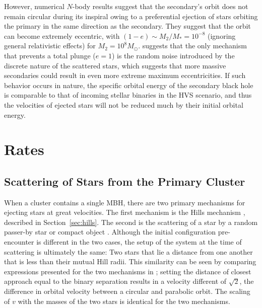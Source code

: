 \documentclass[a4paper,twocolumn]{emulateapj}
\begin{document}
{However, numerical $N$-body results \citep{Baumgardt:2006b,Iwasawa:2011a,Khan:2012a} suggest that the secondary's orbit does not remain circular during its inspiral owing to a preferential ejection of stars orbiting the primary in the same direction as the secondary. They suggest that the orbit can become extremely eccentric, with $(1 - e) \sim M_{2}/M_{\ast} = 10^{-8}$ (ignoring general relativistic effects) for $M_{2} = 10^{8} M_{\odot}$. \citet{Iwasawa:2011a} suggests that the only mechanism that prevents a total plunge ($e = 1$) is the random noise introduced by the discrete nature of the scattered stars, which suggests that more massive secondaries could result in even more extreme maximum eccentricities. If such behavior occurs in nature, the specific orbital energy of the secondary black hole is comparable to that of incoming stellar binaries in the HVS scenario, and thus the velocities of ejected stars will not be reduced much by their initial orbital energy.

\section{Rates}

\subsection{Scattering of Stars from the Primary Cluster}

When a cluster contains a single MBH, there are two primary mechanisms for ejecting stars at great velocities. The first mechanism is the Hills mechanism \citep{Hills:1988a}, described in Section~\ref{sec:hills}. The second is the scattering of a star by a random passer-by star or compact object \citep{Binney:1998a,OLeary:2008a}. Although the initial configuration pre-encounter is different in the two cases, the setup of the system at the time of scattering is ultimately the same: Two stars that lie a distance from one another that is less than their mutual Hill radii. This similarity can be seen by comparing expressions presented for the two mechanisms in \citet{Yu:2003a}; setting the distance of closest approach equal to the binary separation results in a velocity different of $\sqrt{2}$, the difference in orbital velocity between a circular and parabolic orbit. The scaling of $v$ with the masses of the two stars is identical for the two mechanisms.

}
\end{document}
